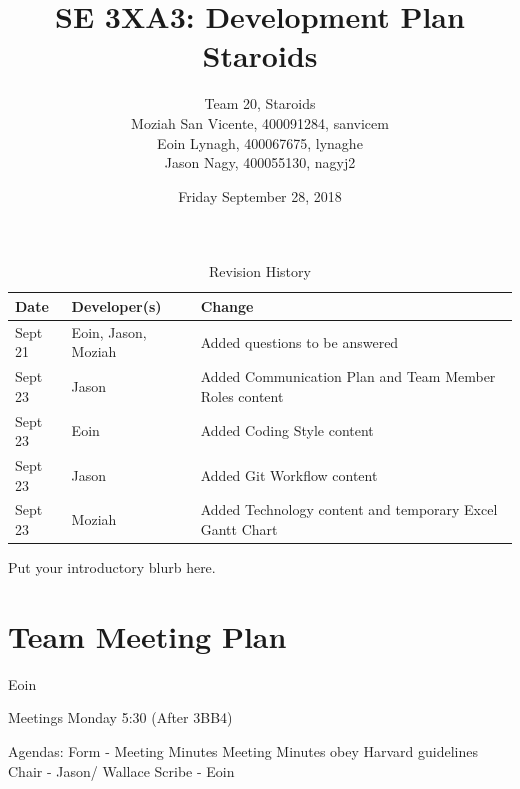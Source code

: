 \documentclass{article}
\title{SE 3XA3: Development Plan\\Staroids}
\author{Team 20, Staroids
		\\ Moziah San Vicente, 400091284, sanvicem
		\\ Eoin Lynagh, 400067675, lynaghe
		\\ Jason Nagy, 400055130, nagyj2
}
\date{Friday September 28, 2018}
\begin{document}
\begin{table}[hp]
\caption{Revision History} \label{TblRevisionHistory}
\begin{tabularx}{\textwidth}{llX}
\toprule
\textbf{Date} & \textbf{Developer(s)} & \textbf{Change}\\
\midrule
Sept 21 & Eoin, Jason, Moziah & Added questions to be answered\\
Sept 23 & Jason & Added Communication Plan and Team Member Roles content\\
Sept 23 & Eoin & Added Coding Style content\\
Sept 23 & Jason & Added Git Workflow content\\
Sept 23 & Moziah & Added Technology content and temporary Excel Gantt Chart\\
\bottomrule
\end{tabularx}
\end{table}

\newpage

\maketitle

Put your introductory blurb here.

\section{Team Meeting Plan}
Eoin

Meetings Monday 5:30 (After 3BB4)

Agendas:
Form - Meeting Minutes
	Meeting Minutes obey Harvard guidelines
Chair - Jason/ Wallace
Scribe - Eoin
\end{document}
